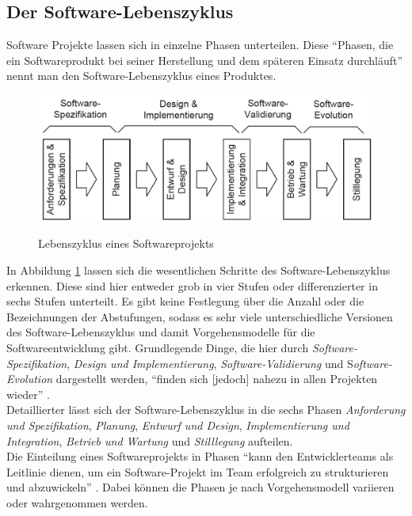 \documentclass [12pt, a4paper, oneside, titlepage, ngerman]{article}
\begin{document}
\subsection{Der Software-Lebenszyklus}
Software Projekte lassen sich in einzelne Phasen unterteilen. Diese "`Phasen, die ein Softwareprodukt bei seiner Herstellung und dem späteren Einsatz durchläuft"' \cite[S.173]{gabler} nennt man den Software-Lebenszyklus eines Produktes.
\begin{figure}[H]
	\centering
	\includegraphics[width=\textwidth,keepaspectratio]{softwarelebenszyklus.PNG}
	\caption{Lebenszyklus eines Softwareprojekts}
	\cite[S.13]{schatten2010}
	\label{img:softwarelebenszyklus}
\end{figure}
\noindent In Abbildung \ref{img:softwarelebenszyklus} lassen sich die wesentlichen Schritte des Software-Lebenszyklus erkennen. Diese sind hier entweder grob in vier Stufen oder differenzierter in sechs Stufen unterteilt. Es gibt keine Festlegung über die Anzahl oder die Bezeichnungen der Abstufungen, sodass es sehr viele unterschiedliche Versionen des Software-Lebenszyklus und damit Vorgehensmodelle für die Softwareentwicklung gibt. Grundlegende Dinge, die hier durch \textit{Software-Spezifikation}, \textit{Design und Implementierung}, \textit{Software-Validierung} und S\textit{oftware-Evolution} dargestellt werden, "`finden sich [jedoch] nahezu in allen Projekten wieder"' \cite[S.13]{schatten2010}. \\ 
Detaillierter lässt sich der Software-Lebenszyklus in die sechs Phasen \textit{Anforderung und Spezifikation}, \textit{Planung}, \textit{Entwurf und Design}, \textit{Implementierung und Integration}, \textit{Betrieb und Wartung} und \textit{Stilllegung} aufteilen. \\
Die Einteilung eines Softwareprojekts in Phasen "`kann den Entwicklerteams als Leitlinie dienen, um ein Software-Projekt im Team erfolgreich zu strukturieren und abzuwickeln"' \cite[S.11]{schatten2010}. Dabei können die Phasen je nach Vorgehensmodell variieren oder wahrgenommen werden.
\end{document}
